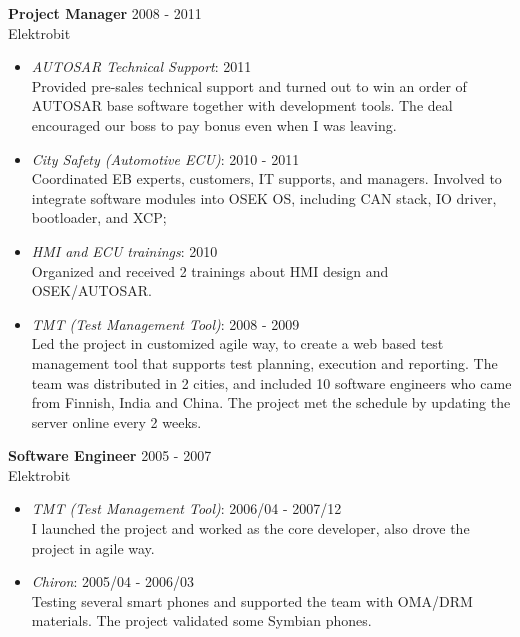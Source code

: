 \textbf{Project Manager} \hfill 2008 - 2011\\
        Elektrobit
        \begin{itemize}  \itemsep -2pt %
            \item {\em AUTOSAR Technical Support}: 2011 \\
                    Provided pre-sales technical support
                    and turned out to win an order of AUTOSAR base software together with development tools.
                    The deal encouraged our boss to pay bonus even when I was leaving.
            \item {\em City Safety (Automotive ECU)}: 2010 - 2011 \\
                    Coordinated EB experts, customers, IT supports, and managers.
                    Involved to integrate software modules into OSEK OS,
                    including CAN stack, IO driver, bootloader, and XCP;
            \item {\em HMI and ECU trainings}: 2010\\
                Organized and received 2 trainings about HMI design and OSEK/AUTOSAR.
            \item {\em TMT (Test Management Tool)}: 2008 - 2009 \\
                    Led the project in customized agile way,
                    to create a web based test management tool
                    that supports test planning, execution and reporting.
                    The team was distributed in 2 cities,
                    and included 10 software engineers who came from Finnish, India and China.
                    The project met the schedule by updating the server online every 2 weeks.
        \end{itemize}
 
\textbf{Software Engineer} \hfill 2005 - 2007 \\
        Elektrobit
        \begin{itemize}  \itemsep -2pt %
            \item {\em TMT (Test Management Tool)}: 2006/04 - 2007/12 \\ 
            I launched the project and worked as the core developer, also drove
            the project in agile way.
            \item {\em Chiron}: 2005/04 - 2006/03 \\
                Testing several smart phones and supported the team with OMA/DRM materials.
                The project validated some Symbian phones.
        \end{itemize}
 
